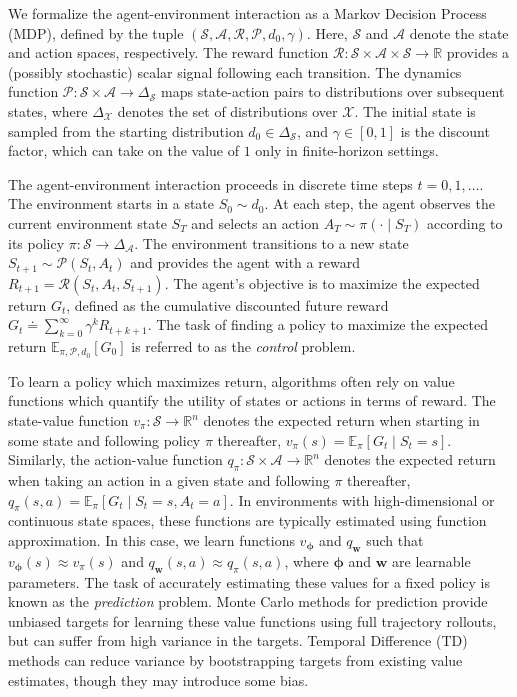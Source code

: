 \documentclass[10pt]{article} %
\newcommand{\stateSpace}{\mathscr{S}}
\newcommand{\actionSpace}{\mathscr{A}}
\newcommand{\rewardFunction}{\mathscr{R}}
\newcommand{\dynamics}{\mathscr{P}}
\newcommand{\startStateDistribution}{d_{0}}
\newcommand{\q}{q}
\newcommand{\qfn}{\q_{\pi}}
\newcommand{\qparams}{{\bm w}}
\newcommand{\qparam}{\q_\qparams}
\renewcommand{\v}{v}
\newcommand{\vfn}{\v_{\pi}}
\newcommand{\vparams}{{\bm \phi}}
\newcommand{\vparam}{\v_\vparams}
\newcommand{\Rn}{\mathbb{R}^{n}}
\newcommand{\discount}{\gamma}
\newcommand{\distributionOver}[1]{\Delta_{#1}}
\begin{document}
We formalize the agent-environment interaction as a Markov Decision Process (MDP), defined by the tuple
$(\stateSpace, \actionSpace, \rewardFunction, \dynamics, \startStateDistribution, \discount)$.
Here, $\stateSpace$ and $\actionSpace$ denote the state and action spaces, respectively. The reward function
$\rewardFunction: \stateSpace \times \actionSpace \times \stateSpace \to \mathbb{R}$ provides a (possibly stochastic)
scalar signal following each transition. The dynamics function $\dynamics: \stateSpace \times \actionSpace \to \distributionOver{\stateSpace}$
maps state-action pairs to distributions over subsequent states, where $\distributionOver{\mathscr{X}}$ denotes
the set of distributions over $\mathscr{X}$. The initial state is sampled from the starting distribution
$\startStateDistribution \in \distributionOver{\stateSpace}$, and $\discount \in [0, 1]$ is the discount factor, which
can take on the value of $1$ only in finite-horizon settings.

The agent-environment interaction proceeds in discrete time steps $t = 0, 1, \ldots$. The environment starts in a state
$S_0 \sim \startStateDistribution$. At each step, the agent observes
the current environment state $S_T$ and selects an action $A_T \sim \pi(\cdot \mid S_T)$ according to its policy $\pi:
\stateSpace \to \distributionOver{\actionSpace}$. The environment transitions to a new state $S_{t + 1} \sim
\dynamics(S_t, A_t)$ and provides the agent with a reward $R_{t+1} = \rewardFunction(S_t, A_t, S_{t + 1})$.
The agent's objective is to maximize the expected return $G_t$, defined as the cumulative discounted future reward $G_t
\doteq \sum_{k=0}^\infty \discount^k R_{t + k + 1}$. The task of finding a policy to maximize the expected return
$\mathbb{E}_{\pi, \dynamics, \startStateDistribution} \left[ G_0 \right]$ is referred to as the \textit{control}
problem.

To learn a policy which maximizes return, algorithms often rely on value functions which quantify the utility of states or
actions in terms of reward. The state-value function $\vfn: \stateSpace \to \Rn$ denotes the expected return when
starting in some state and following policy $\pi$ thereafter, $ \vfn(s) = \mathbb{E}_\pi \left[ G_t \mid S_t = s \right] $.
Similarly, the action-value function $\qfn: \stateSpace \times \actionSpace \to \Rn$ denotes the expected return when
taking an action in a given state and following $\pi$ thereafter, $ \qfn(s, a) = \mathbb{E}_\pi \left[ G_t \mid S_t = s,
A_t = a \right] $. In environments with high-dimensional or continuous state spaces, these functions are typically
estimated using function approximation. In this case, we learn functions $\vparam$ and $\qparam$ such that $\vparam(s)
\approx \vfn(s)$ and $\qparam(s, a) \approx \qfn(s, a)$, where $\vparams$ and $\qparams$ are learnable parameters. The
task of accurately estimating these values for a fixed policy is known as the \textit{prediction} problem. Monte Carlo
methods for prediction provide unbiased targets for learning these value functions using full trajectory rollouts, but
can suffer from high variance in the targets. Temporal Difference (TD) methods can reduce variance by
bootstrapping targets from existing value estimates, though they may introduce some bias.
\end{document}
